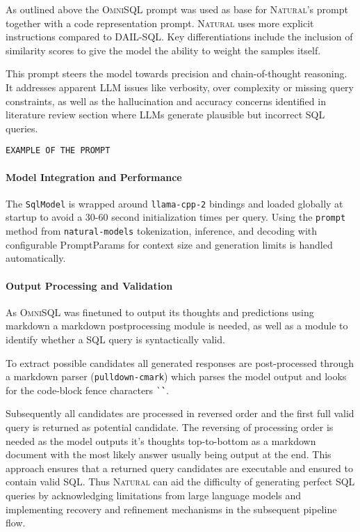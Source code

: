 As outlined above the \textsc{OmniSQL} prompt was used as base for
\textsc{Natural}'s prompt together with a code representation prompt.
\textsc{Natural} uses more explicit instructions compared to DAIL-SQL. Key
differentiations include the inclusion of similarity scores to give the model
the ability to weight the samples itself.

This prompt steers the model towards precision and chain-of-thought reasoning. 
It addresses apparent LLM issues like verbosity, over complexity or missing
query constraints, as well as the hallucination and accuracy concerns
identified in literature review section where LLMs generate plausible but
incorrect SQL queries.

\begin{verbatim}
EXAMPLE OF THE PROMPT
\end{verbatim}

\paragraph{Model Integration and Performance}

The \texttt{SqlModel} is wrapped around \texttt{llama-cpp-2} bindings and
loaded globally at startup to avoid a 30-60 second initialization times per
query. Using the \texttt{prompt} method from \texttt{natural-models}
tokenization, inference, and decoding with configurable PromptParams for
context size and generation limits is handled automatically.

\paragraph{Output Processing and Validation}

As \textsc{OmniSQL} was finetuned to output its thoughts and predictions using
markdown a markdown postprocessing module is needed, as well as a module to
identify whether a SQL query is syntactically valid.

To extract possible candidates all generated responses are post-processed
through a markdown parser (\texttt{pulldown-cmark}) which parses the model
output and looks for the code-block fence characters \texttt{\`\`\` }.

Subsequently all candidates are processed in reversed order and the first full
valid query is returned as potential candidate. The reversing of processing
order is needed as the model outputs it's thoughts top-to-bottom as a markdown
document with the most likely answer usually being output at the end. This
approach ensures that a returned query candidates are executable and
ensured to contain valid SQL. Thus \textsc{Natural} can aid the
difficulty of generating perfect SQL queries by acknowledging
limitations from large language models and implementing recovery and refinement
mechanisms in the subsequent pipeline flow.
